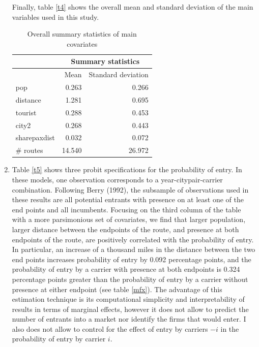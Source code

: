 \documentclass[12pt,english]{article}
\begin{document}
\begin{enumerate}
Finally, table \eqref{t4} shows the overall mean and standard deviation of the main variables used in this study.

\begin{table}[H]
  \centering
  \caption{Overall summary statistics of main covariates}
    \begin{tabular}{lrr}
    \hline
          & \multicolumn{2}{c}{Summary statistics} \\
    \hline
          & Mean  & Standard deviation \\
          \hline
    pop   & 0.263 & 0.266 \\
    distance & 1.281 & 0.695 \\
    tourist & 0.288 & 0.453 \\
    city2 & 0.268 & 0.443 \\
    sharepaxdist & 0.032 & 0.072\\
    \# routes & 14.540 & 26.972 \\
    \hline
    \end{tabular}%
  \label{t4}%
\end{table}


\item  Table \eqref{t5} shows three probit specifications for the probability of entry. In these models, one observation corresponds to a year-citypair-carrier combination. Following Berry (1992), the subsample of observations used in these results are all potential entrants with presence on at least one of the end points
 and all incumbents. Focusing on the third column of the table with a more parsimonious set of covariates, we find that larger population, larger distance between the endpoints of the route, and presence at both endpoints of the route, are positively correlated with the probability of entry. In particular, an increase of a thousand miles in the distance between the two end points increases probability of entry by 0.092 percentage points, and the probability of entry by a carrier with presence at both endpoints is 0.324 percentage points greater than the probability of entry by a carrier without presence at either endpoint (see table \ref{mfx}). The advantage of this estimation technique is its computational simplicity and interpretability of results in terms of marginal effects, however it does not allow to predict the number of entrants into a market nor identify the firms that would enter.  I also does not allow to control for the effect of entry by carriers $-i$ in the probability of entry by carrier $i$.




\end{enumerate}
\end{document}
